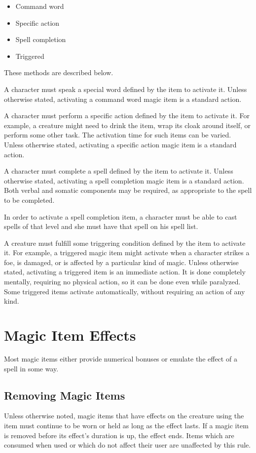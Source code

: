 \begin{itemize}
    \item Command word
    \item Specific action
    \item Spell completion
    \item Triggered
\end{itemize}

These methods are described below.

 A character must speak a special word defined by the item to activate it.
Unless otherwise stated, activating a command word magic item is a standard action.

 A character must perform a specific action defined by the item to activate it.
For example, a creature might need to drink the item, wrap its cloak around itself, or perform some other task.
The activation time for such items can be varied.
Unless otherwise stated, activating a specific action magic item is a standard action.

 A character must complete a spell defined by the item to activate it.
Unless otherwise stated, activating a spell completion magic item is a standard action.
Both verbal and somatic components may be required, as appropriate to the spell to be completed.

In order to activate a spell completion item, a character must be able to cast spells of that level and she must have that spell on his spell list.

 A creature must fulfill some triggering condition defined by the item to activate it.
For example, a triggered magic item might activate when a character strikes a foe, is damaged, or is affected by a particular kind of magic.
Unless otherwise stated, activating a triggered item is an immediate action.
It is done completely mentally, requiring no physical action, so it can be done even while paralyzed.
Some triggered items activate automatically, without requiring an action of any kind.

\section{Magic Item Effects}
Most magic items either provide numerical bonuses or emulate the effect of a spell in some way.

\subsection{Removing Magic Items}
Unless otherwise noted, magic items that have effects on the creature using the item must continue to be worn or held as long as the effect lasts.
If a magic item is removed before its effect's duration is up, the effect ends.
Items which are consumed when used or which do not affect their user are unaffected by this rule.

